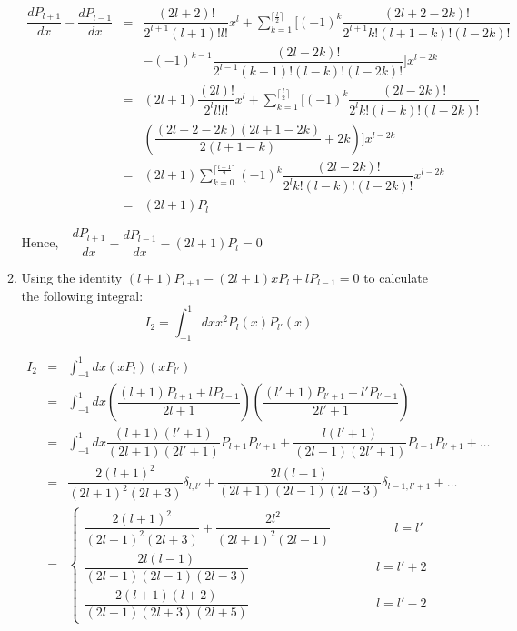 \documentclass[a4paper,11pt]{article}
\begin{document}
\begin{enumerate}
\begin{enumerate}
    \begin{eqnarray}
      \dfrac{dP_{l+1}}{dx}-\dfrac{dP_{l-1}}{dx}&=&\dfrac{(2l+2)!}{2^{l+1}(l+1)!l!}x^{l}+\sum\limits_{k=1}^{\lceil\frac{l}{2}\rceil}\Big[{(-1)}^k\dfrac{(2l+2-2k)!}{2^{l+1}k!(l+1-k)!(l-2k)!}\nonumber \\
      &&-{(-1)}^{k-1}\dfrac{(2l-2k)!}{2^{l-1} (k-1)!(l-k)!(l-2k)!}\Big]x^{l-2k}\nonumber \\
      &=& (2l+1)\dfrac{(2l)!}{2^l l!l!}x^l+\sum\limits_{k=1}^{\lceil\frac{l}{2}\rceil}\Big[{(-1)}^k\dfrac{(2l-2k)!}{2^{l}k!(l-k)!(l-2k)!}\nonumber \\
      &&(\dfrac{(2l+2-2k)(2l+1-2k)}{2(l+1-k)}+2k)\Big]x^{l-2k}\nonumber \\
      &=&(2l+1)\sum\limits^{\lceil\frac{l-1}{2}\rceil}_{k=0}{(-1)}^k\dfrac{(2l-2k)!}{2^l k!(l-k)!(l-2k)!}x^{l-2k}\nonumber \\
      &=&(2l+1)P_l
    \end{eqnarray}
    
    Hence,$\quad \dfrac{dP_{l+1}}{dx}-\dfrac{dP_{l-1}}{dx}-(2l+1)P_l=0$
    
    \item Using the identity $(l+1)P_{l+1}-(2l+1)xP_l+lP_{l-1}=0$ to calculate the following integral:
    \begin{equation}
      I_2=\int^{1}_{-1}dx x^2 P_l(x)P_{l'}(x) \nonumber
    \end{equation}
    
    \begin{eqnarray}
      I_2
      &=&\int^{1}_{-1}dx(xP_l)(xP_{l'})\nonumber \\
      &=&\int^{1}_{-1}dx(\dfrac{(l+1)P_{l+1}+lP_{l-1}}{2l+1})(\dfrac{(l'+1)P_{l'+1}+l'P_{l'-1}}{2l'+1})\nonumber \\
      &=&\int^{1}_{-1}dx\dfrac{(l+1)(l'+1)}{(2l+1)(2l'+1)}P_{l+1}P_{l'+1}+\dfrac{l(l'+1)}{(2l+1)(2l'+1)}P_{l-1}P_{l'+1}+\dotso\nonumber \\
      &=&\dfrac{2{(l+1)}^2}{{(2l+1)}^2(2l+3)}\delta_{l,l'}+\dfrac{2l(l-1)}{(2l+1)(2l-1)(2l-3)}\delta_{l-1,l'+1}+\dotso\nonumber \\
      &=&\begin{cases}
        \dfrac{2{(l+1)}^2}{{(2l+1)}^2(2l+3)}+\dfrac{2l^2}{{(2l+1)}^2(2l-1)}\quad\quad\quad\quad\quad l=l' \\
        \dfrac{2l(l-1)}{(2l+1)(2l-1)(2l-3)}\quad\quad\quad\quad\quad\quad\quad\quad\quad\quad l=l'+2 \\
        \dfrac{2(l+1)(l+2)}{(2l+1)(2l+3)(2l+5)}\quad\quad\quad\quad\quad\quad\quad\quad\quad\quad l=l'-2
      \end{cases}
    \end{eqnarray}
  \end{enumerate}


\end{enumerate}
\end{document}
